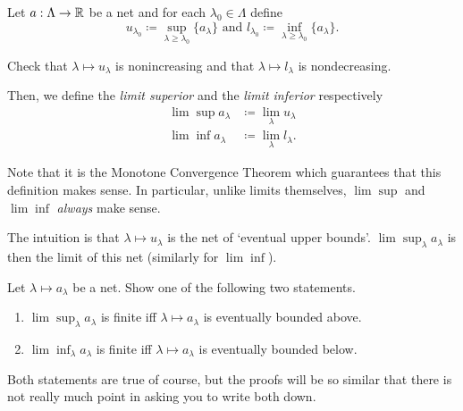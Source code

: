 \begin{dfn}
Let $a:\Lambda \rightarrow \mathbb{R}$ be a net and for each $\lambda _0\in \Lambda$ define
\begin{equation}\label{3.3.48}
u_{\lambda _0}\coloneqq \sup _{\lambda \geq \lambda _0}\{ a_\lambda \} \text{ and }l_{\lambda _0}\coloneqq \inf _{\lambda \geq \lambda _0}\{ a_\lambda \} .
\end{equation}
\begin{exr}
Check that $\lambda \mapsto u_\lambda$ is nonincreasing and that $\lambda \mapsto l_\lambda$ is nondecreasing.
\end{exr}
Then, we define the \emph{limit superior} and the \emph{limit inferior} respectively
\begin{equation}\label{3.3.50}
\begin{split}
\lim \sup a_\lambda & \coloneqq \lim _\lambda u_\lambda \\
\lim \inf a_\lambda &\coloneqq \lim _\lambda l_\lambda .
\end{split}
\end{equation}
\begin{rmk}
Note that it is the Monotone Convergence Theorem which guarantees that this definition makes sense.  In particular, unlike limits themselves, $\lim \sup$ and $\lim \inf$ \emph{always} make sense.
\end{rmk}
\begin{rmk}
The intuition is that $\lambda \mapsto u_\lambda$ is the net of `eventual upper bounds'.  $\lim \sup _\lambda a_\lambda$ is then the limit of this net (similarly for $\lim \inf$).
\end{rmk}
\end{dfn}
\begin{dfn}
Let $\lambda \mapsto a_\lambda$ be a net.  Show one of the following two statements.
\begin{enumerate}
\item $\lim \sup _\lambda a_\lambda$ is finite iff $\lambda \mapsto a_\lambda$ is eventually bounded above.
\item $\lim \inf _\lambda a_\lambda$ is finite iff $\lambda \mapsto a_\lambda$ is eventually bounded below.
\end{enumerate}
\begin{rmk}
Both statements are true of course, but the proofs will be so similar that there is not really much point in asking you to write both down.
\end{rmk}
\end{dfn}

